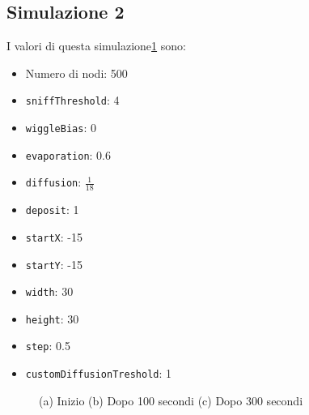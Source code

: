\subsection{Simulazione 2}\label{sim2}
I valori di questa simulazione\space \cref{fig:sim2} sono:
\begin{itemize}
    \item Numero di nodi: 500
    \item \texttt{sniffThreshold}: 4
    \item \texttt{wiggleBias}: 0
    \item \texttt{evaporation}: 0.6
    \item \texttt{diffusion}: $\frac{1}{18}$
    \item \texttt{deposit}: 1
    \item \texttt{startX}: -15
    \item \texttt{startY}: -15
    \item \texttt{width}: 30
    \item \texttt{height}: 30
    \item \texttt{step}: 0.5
    \item \texttt{customDiffusionTreshold}: 1
\end{itemize}
\begin{figure}[ht]
    \centering
    \caption{(a) Inizio (b) Dopo 100 secondi (c) Dopo 300 secondi}\label{fig:sim2}
\end{figure}

